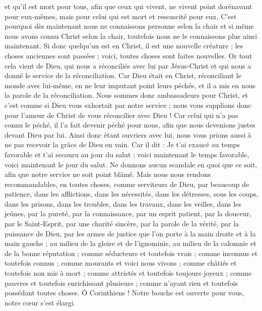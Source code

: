\begin{multicols}{2}
et qu'il est mort pour tous, afin que ceux qui vivent, ne vivent point dorénavant pour eux-mêmes, mais pour celui qui est mort et ressuscité pour eux.
C'est pourquoi dès maintenant nous ne connaissons personne selon la chair et si même nous avons connu Christ selon la chair, toutefois nous ne le connaissons plus ainsi maintenant.
Si donc quelqu'un est en Christ, il est une nouvelle créature ; les choses anciennes sont passées ; voici, toutes choses sont faites nouvelles.
Or tout cela vient de Dieu, qui nous a réconciliés avec lui par Jésus-Christ et qui nous a donné le service de la réconciliation.
Car Dieu était en Christ, réconciliant le monde avec lui-même, en ne leur imputant point leurs péchés, et il a mis en nous la parole de la réconciliation.
Nous sommes donc ambassadeurs pour Christ, et c'est comme si Dieu vous exhortait par notre service ; nous vous supplions donc pour l'amour de Christ de vous réconcilier avec Dieu !
Car celui qui n'a pas connu le péché, il l'a fait devenir péché pour nous, afin que nous devenions justes devant Dieu par lui.
\VerseOne{}Ainsi donc étant ouvriers avec lui, nous vous prions aussi à ne pas recevoir la grâce de Dieu en vain.
Car il dit : Je t'ai exaucé au temps favorable et t'ai secouru au jour du salut ; voici maintenant le temps favorable, voici maintenant le jour du salut.
Ne donnons aucun scandale en quoi que ce soit, afin que notre service ne soit point blâmé.
Mais nous nous rendons recommandables, en toutes choses, comme serviteurs de Dieu, par beaucoup de patience, dans les afflictions, dans les nécessités, dans les détresses,
sous les coups, dans les prisons, dans les troubles, dans les travaux, dans les veilles, dans les jeûnes,
par la pureté, par la connaissance, par un esprit patient, par la douceur, par le Saint-Esprit, par une charité sincère,
par la parole de la vérité, par la puissance de Dieu, par les armes de justice que l'on porte à la main droite et à la main gauche ;
au milieu de la gloire et de l'ignominie, au milieu de la calomnie et de la bonne réputation ; comme séducteurs et toutefois vrais ;
comme inconnus et toutefois connus ; comme mourants et voici nous vivons ; comme châtiés et toutefois non mis à mort ;
comme attristés et toutefois toujours joyeux ; comme pauvres et toutefois enrichissant plusieurs ; comme n'ayant rien et toutefois possédant toutes choses.
Ô Corinthiens ! Notre bouche est ouverte pour vous, notre cœur s'est élargi.

\end{multicols}
